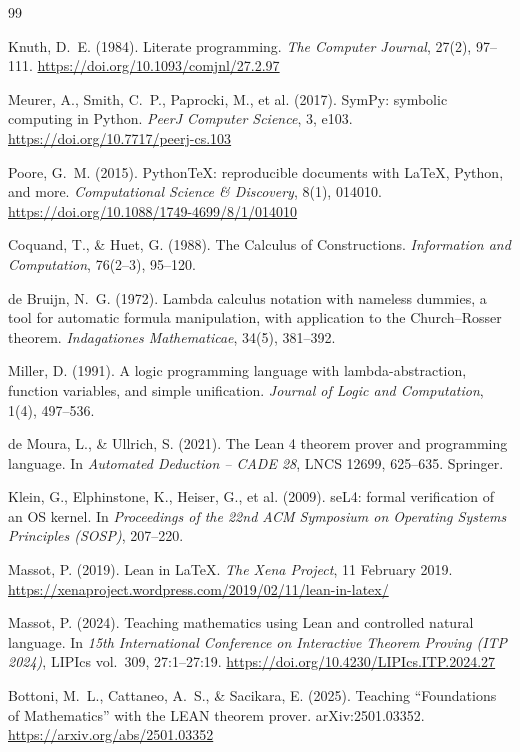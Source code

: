 \documentclass[11pt]{article}
\begin{document}

\small
\begin{thebibliography}{99}

 Knuth, D.~E. (1984). Literate programming. \emph{The Computer
Journal}, 27(2), 97--111. \url{https://doi.org/10.1093/comjnl/27.2.97}

 Meurer, A., Smith, C.~P., Paprocki, M., et al. (2017). SymPy:
symbolic computing in Python. \emph{PeerJ Computer Science}, 3, e103.
\url{https://doi.org/10.7717/peerj-cs.103}

 Poore, G.~M. (2015). PythonTeX: reproducible documents with
\LaTeX{}, Python, and more. \emph{Computational Science \& Discovery}, 8(1),
014010. \url{https://doi.org/10.1088/1749-4699/8/1/014010}

 Coquand, T., \& Huet, G. (1988). The Calculus of
Constructions. \emph{Information and Computation}, 76(2--3), 95--120.

 de Bruijn, N.~G. (1972). Lambda calculus notation with
nameless dummies, a tool for automatic formula manipulation, with application
to the Church--Rosser theorem. \emph{Indagationes Mathematicae}, 34(5),
381--392.

 Miller, D. (1991). A logic programming language with
lambda-abstraction, function variables, and simple unification. \emph{Journal
of Logic and Computation}, 1(4), 497--536.

 de Moura, L., \& Ullrich, S. (2021). The Lean 4 theorem
prover and programming language. In \emph{Automated Deduction -- CADE 28},
LNCS 12699, 625--635. Springer.

 Klein, G., Elphinstone, K., Heiser, G., et al. (2009).
seL4: formal verification of an OS kernel. In \emph{Proceedings of the 22nd
ACM Symposium on Operating Systems Principles (SOSP)}, 207--220.

 Massot, P. (2019). Lean in \LaTeX{}. \emph{The Xena
Project}, 11 February 2019.
\url{https://xenaproject.wordpress.com/2019/02/11/lean-in-latex/}

 Massot, P. (2024). Teaching mathematics using Lean and
controlled natural language. In \emph{15th International Conference on
Interactive Theorem Proving (ITP 2024)}, LIPIcs vol.~309, 27:1--27:19.
\url{https://doi.org/10.4230/LIPIcs.ITP.2024.27}

 Bottoni, M.~L., Cattaneo, A.~S., \& Sacikara, E. (2025).
Teaching ``Foundations of Mathematics'' with the LEAN theorem prover.
arXiv:2501.03352. \url{https://arxiv.org/abs/2501.03352}


\end{thebibliography}
\end{document}
